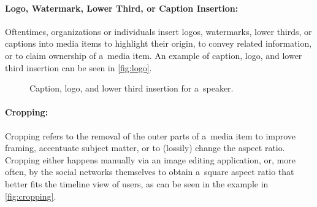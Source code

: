 \paragraph{Logo, Watermark, Lower Third, or Caption Insertion:}

Oftentimes, organizations or individuals insert
logos, watermarks, lower thirds, or captions into media items
to highlight their origin, to convey related information,
or to claim ownership of a~media item.
An example of caption, logo, and lower third insertion
can be seen in \autoref{fig:logo}.

\begin{figure}[!ht]
  \centering
  \caption{Caption, logo, and lower third insertion for a~speaker.}
  \label{fig:logo}  
\end{figure}

\paragraph{Cropping:}

Cropping refers to the removal of the outer parts of a~media item
to improve framing, accentuate subject matter,
or to (lossily) change the aspect ratio.
Cropping either happens manually via an image editing application,
or, more often, by the social networks themselves
to obtain a~square aspect ratio
that better fits the timeline view of users,
as can be seen in the example in \autoref{fig:cropping}.

